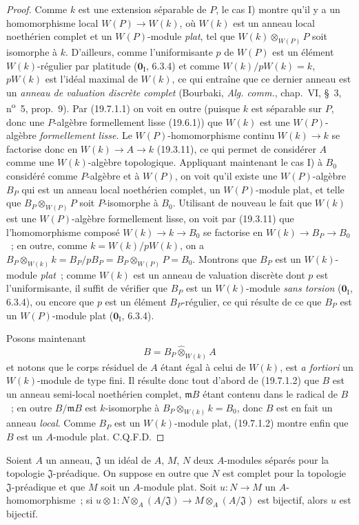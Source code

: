 \begin{proof}
Comme $k$ est une extension séparable de $P$, le cas I) montre qu'il y a un
homomorphisme local $W(P)\to W(k)$, où $W(k)$ est un anneau local noethérien
complet et un $W(P)$-module \emph{plat}, tel que $W(k)\otimes_{W(P)}P$ soit isomorphe
à $k$. D'ailleurs, comme l'uniformisante $p$ de $W(P)$ est un élément
$W(k)$-régulier par platitude ($\mathbf 0_{\mathrm I}$, 6.3.4) et comme
$W(k)/pW(k)=k$, $pW(k)$ est l'idéal maximal de $W(k)$, ce qui entraîne que ce
dernier anneau est un \emph{anneau de valuation discrète complet} (Bourbaki,
\emph{Alg. comm.}, chap.~VI, §~3, n\textsuperscript{o}~5, prop.~9). Par
(19.7.1.1) on voit en outre (puisque $k$ est séparable sur $P$, donc une
$P$-algèbre formellement lisse (19.6.1)) que $W(k)$ est une $W(P)$-algèbre
\emph{formellement lisse}. Le $W(P)$-homomorphisme continu $W(k)\to k$ se
factorise donc en $W(k)\to A\to k$ (19.3.11), ce qui permet de considérer $A$
comme une $W(k)$-algèbre topologique. Appliquant maintenant le cas I) à $B_0$
considéré comme $P$-algèbre et à $W(P)$, on voit qu'il existe une
$W(P)$-algèbre $B_P$ qui est un anneau local noethérien complet, un
$W(P)$-module plat, et telle que $B_P\otimes_{W(P)}P$ soit $P$-isomorphe à
$B_0$. Utilisant de nouveau le fait que $W(k)$ est une $W(P)$-algèbre
formellement lisse, on voit par (19.3.11) que l'homomorphisme composé
$W(k)\to k\to B_0$ se factorise en $W(k)\to B_P\to B_0$~; en outre, comme
$k=W(k)/pW(k)$, on a
$B_P\otimes_{W(k)}k=B_P/pB_P=B_P\otimes_{W(P)}P=B_0$. Montrons que $B_P$ est
un $W(k)$-module \emph{plat}~; comme $W(k)$ est un anneau de valuation discrète
dont $p$ est l'uniformisante, il suffit de vérifier que $B_P$ est un
$W(k)$-module \emph{sans torsion} ($\mathbf 0_{\mathrm I}$, 6.3.4), ou encore
que $p$ est un élément $B_P$-régulier, ce qui résulte de ce que $B_P$ est un
$W(P)$-module plat ($\mathbf 0_{\mathrm I}$, 6.3.4).

Posons maintenant
\[
  B=B_P\widehat\otimes_{W(k)}A
\]
et notons que le corps résiduel de $A$ étant égal à celui de $W(k)$, est
\emph{a fortiori} un $W(k)$-module de type fini. Il résulte donc tout d'abord
de (19.7.1.2) que $B$ est un anneau semi-local noethérien complet,
$\mathfrak mB$ étant contenu dans le radical de $B$~; en outre
$B/\mathfrak mB$ est $k$-isomorphe à
$B_P\otimes_{W(k)}k=B_0$, donc $B$ est en fait un anneau \emph{local}. Comme $B_P$
est un $W(k)$-module plat, (19.7.1.2) montre enfin que $B$ est un $A$-module
plat. C.Q.F.D.
\end{proof}

\begin{lemma}[19.7.1.4]
\label{0.19.7.1.4-fr}
Soient $A$ un anneau, $\mathfrak J$ un idéal de $A$, $M$, $N$ deux $A$-modules
séparés pour la topologie $\mathfrak J$-préadique. On suppose en outre que $N$
est complet pour la topologie $\mathfrak J$-préadique et que $M$ soit un
$A$-module plat. Soit $u:N\to M$ un $A$-homomorphisme~; si
$u\otimes1:N\otimes_A(A/\mathfrak J)\to M\otimes_A(A/\mathfrak J)$ est
bijectif, alors $u$ est bijectif.
\end{lemma}

